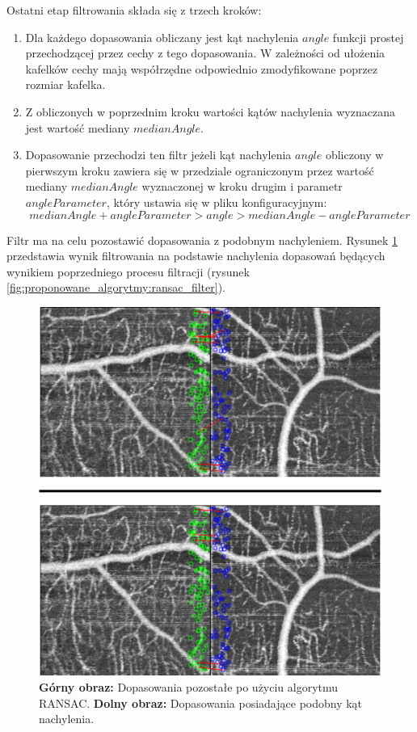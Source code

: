 Ostatni etap filtrowania składa się z trzech kroków:

\begin{enumerate}
\item Dla każdego dopasowania obliczany jest kąt nachylenia $angle$ funkcji prostej przechodzącej przez cechy z tego dopasowania. W zależności od ułożenia kafelków cechy mają współrzędne odpowiednio zmodyfikowane poprzez rozmiar kafelka.
\item Z obliczonych w poprzednim kroku wartości kątów nachylenia wyznaczana jest wartość mediany $medianAngle$.
\item Dopasowanie przechodzi ten filtr jeżeli kąt nachylenia $angle$ obliczony w pierwszym kroku zawiera się w przedziale ograniczonym przez wartość mediany $medianAngle$ wyznaczonej w kroku drugim i parametr $angleParameter$, który ustawia się w pliku konfiguracyjnym:
\begin{equation}
medianAngle + angleParameter > angle > medianAngle - angleParameter
\label{eq:angle}
\end{equation}
\end{enumerate}

Filtr ma na celu pozostawić dopasowania z podobnym nachyleniem. Rysunek \ref{fig:proponowane_algorytmy:slope} przedstawia wynik filtrowania na podstawie nachylenia dopasowań będących wynikiem poprzedniego procesu filtracji (rysunek \ref{fig:proponowane_algorytmy:ransac_filter}).

\begin{figure}[H]
  \centering
  \includegraphics[width=\textwidth]{gfx/slope}
  \caption{\textbf{Górny obraz:} Dopasowania pozostałe po użyciu algorytmu RANSAC. \textbf{Dolny obraz:} Dopasowania posiadające podobny kąt nachylenia.}
  \label{fig:proponowane_algorytmy:slope}
\end{figure}

